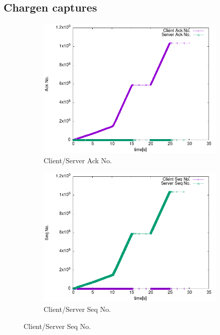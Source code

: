 \documentclass{exam}
\begin{document}
\subsection{Chargen captures}
\begin{figure}[H]
    \centering
    \begin{subfigure}[b]{0.4\textwidth}
        \centering
        \includegraphics[width=\textwidth]{base_test/ack.png}
        \caption{Client/Server Ack No.}
        \label{fig:ack}
    \end{subfigure}
    \hfill
    \begin{subfigure}[b]{0.4\textwidth}
        \centering
        \includegraphics[width=\textwidth]{base_test/seq.png}
        \caption{Client/Server Seq No.}

\end{subfigure}
\end{figure}
\end{document}

